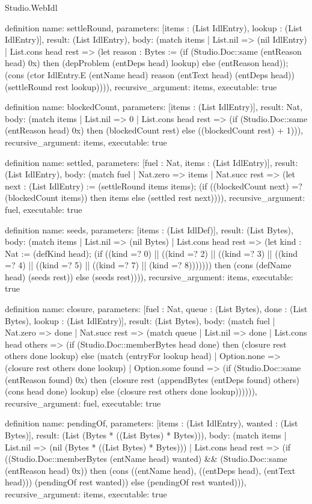 \begin{lexlean}{Studio.WebIdl}
\begin{semanticmodule}
{{definition{
  name: settleRound,
  parameters: [items : (List IdlEntry), lookup : (List IdlEntry)],
  result: (List IdlEntry),
  body: (match items
    | List.nil => (nil IdlEntry)
    | List.cons head rest => (let reason : Bytes := (if (Studio.Doc::same (entReason head) 0x) then (depProblem (entDeps head) lookup) else (entReason head)); (cons (ctor IdlEntry.E (entName head) reason (entText head) (entDeps head)) (settleRound rest lookup)))),
  recursive_argument: items,
  executable: true
}

definition{
  name: blockedCount,
  parameters: [items : (List IdlEntry)],
  result: Nat,
  body: (match items
    | List.nil => 0
    | List.cons head rest => (if (Studio.Doc::same (entReason head) 0x) then (blockedCount rest) else ((blockedCount rest) + 1))),
  recursive_argument: items,
  executable: true
}

definition{
  name: settled,
  parameters: [fuel : Nat, items : (List IdlEntry)],
  result: (List IdlEntry),
  body: (match fuel
    | Nat.zero => items
    | Nat.succ rest => (let next : (List IdlEntry) := (settleRound items items); (if ((blockedCount next) =? (blockedCount items)) then items else (settled rest next)))),
  recursive_argument: fuel,
  executable: true
}

definition{
  name: seeds,
  parameters: [items : (List IdlDef)],
  result: (List Bytes),
  body: (match items
    | List.nil => (nil Bytes)
    | List.cons head rest => (let kind : Nat := (defKind head); (if ((kind =? 0) || ((kind =? 2) || ((kind =? 3) || ((kind =? 4) || ((kind =? 5) || ((kind =? 7) || (kind =? 8))))))) then (cons (defName head) (seeds rest)) else (seeds rest)))),
  recursive_argument: items,
  executable: true
}

definition{
  name: closure,
  parameters: [fuel : Nat, queue : (List Bytes), done : (List Bytes), lookup : (List IdlEntry)],
  result: (List Bytes),
  body: (match fuel
    | Nat.zero => done
    | Nat.succ rest => (match queue
    | List.nil => done
    | List.cons head others => (if (Studio.Doc::memberBytes head done) then (closure rest others done lookup) else (match (entryFor lookup head)
    | Option.none => (closure rest others done lookup)
    | Option.some found => (if (Studio.Doc::same (entReason found) 0x) then (closure rest (appendBytes (entDeps found) others) (cons head done) lookup) else (closure rest others done lookup)))))),
  recursive_argument: fuel,
  executable: true
}

definition{
  name: pendingOf,
  parameters: [items : (List IdlEntry), wanted : (List Bytes)],
  result: (List (Bytes * ((List Bytes) * Bytes))),
  body: (match items
    | List.nil => (nil (Bytes * ((List Bytes) * Bytes)))
    | List.cons head rest => (if ((Studio.Doc::memberBytes (entName head) wanted) && (Studio.Doc::same (entReason head) 0x)) then (cons ((entName head), ((entDeps head), (entText head))) (pendingOf rest wanted)) else (pendingOf rest wanted))),
  recursive_argument: items,
  executable: true
}

}}
\end{semanticmodule}
\end{lexlean}
